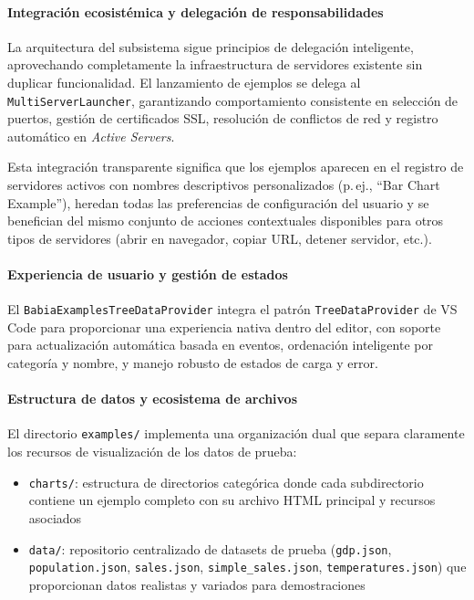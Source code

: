 \documentclass[a4paper, 12pt]{book}
\begin{document}
\paragraph{Integración ecosistémica y delegación de responsabilidades}
La arquitectura del subsistema sigue principios de delegación inteligente, aprovechando completamente la infraestructura de servidores existente sin duplicar funcionalidad. El lanzamiento de ejemplos se delega al \texttt{MultiServerLauncher}, garantizando comportamiento consistente en selección de puertos, gestión de certificados SSL, resolución de conflictos de red y registro automático en \emph{Active Servers}.

Esta integración transparente significa que los ejemplos aparecen en el registro de servidores activos con nombres descriptivos personalizados (p.\,ej., ``Bar Chart Example''), heredan todas las preferencias de configuración del usuario y se benefician del mismo conjunto de acciones contextuales disponibles para otros tipos de servidores (abrir en navegador, copiar URL, detener servidor, etc.).

\paragraph{Experiencia de usuario y gestión de estados}
El \texttt{BabiaExamplesTreeDataProvider} integra el patrón \texttt{TreeDataProvider} de VS Code para proporcionar una experiencia nativa dentro del editor, con soporte para actualización automática basada en eventos, ordenación inteligente por categoría y nombre, y manejo robusto de estados de carga y error.

\paragraph{Estructura de datos y ecosistema de archivos}
El directorio \texttt{examples/} implementa una organización dual que separa claramente los recursos de visualización de los datos de prueba:

\begin{itemize}
  \item \texttt{charts/}: estructura de directorios categórica donde cada subdirectorio contiene un ejemplo completo con su archivo HTML principal y recursos asociados
  \item \texttt{data/}: repositorio centralizado de datasets de prueba (\texttt{gdp.json}, \texttt{population.json}, \texttt{sales.json}, \texttt{simple\_sales.json}, \texttt{temperatures.json}) que proporcionan datos realistas y variados para demostraciones
\end{itemize}
\end{document}
